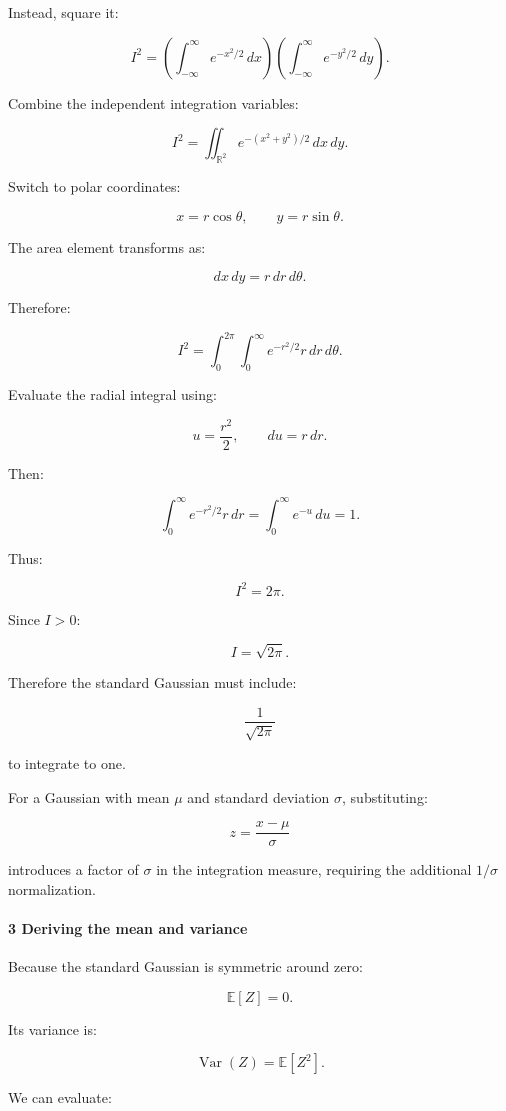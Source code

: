 Instead, square it:

\[
 I^2= \left(\int_{-\infty}^{\infty}e^{-x^2/2}\,dx\right) \left(\int_{-\infty}^{\infty}e^{-y^2/2}\,dy\right).
\]

Combine the independent integration variables:

\[
 I^2= \iint_{\mathbb R^2} e^{-(x^2+y^2)/2}\,dx\,dy.
\]

Switch to polar coordinates:

\[
 x=r\cos\theta, \qquad y=r\sin\theta.
\]

The area element transforms as:

\[
 dx\,dy=r\,dr\,d\theta.
\]

Therefore:

\[
 I^2= \int_0^{2\pi}\int_0^\infty e^{-r^2/2}r\,dr\,d\theta.
\]

Evaluate the radial integral using:

\[
 u=\frac{r^2}{2}, \qquad du=r\,dr.
\]

Then:

\[
 \int_0^\infty e^{-r^2/2}r\,dr = \int_0^\infty e^{-u}\,du =1.
\]

Thus:

\[
 I^2=2\pi.
\]

Since \(I>0\):

\[
 \boxed{I=\sqrt{2\pi}}.
\]

Therefore the standard Gaussian must include:

\[
 \frac1{\sqrt{2\pi}}
\]

to integrate to one.

For a Gaussian with mean \(\mu\) and standard deviation \(\sigma\), substituting:

\[
 z=\frac{x-\mu}{\sigma}
\]

introduces a factor of \(\sigma\) in the integration measure, requiring the additional \(1/\sigma\) normalization.

\paragraph{3 Deriving the mean and variance}\label{deriving-the-mean-and-variance}

Because the standard Gaussian is symmetric around zero:

\[
 \mathbb E[Z]=0.
\]

Its variance is:

\[
 \operatorname{Var}(Z)=\mathbb E[Z^2].
\]

We can evaluate:

